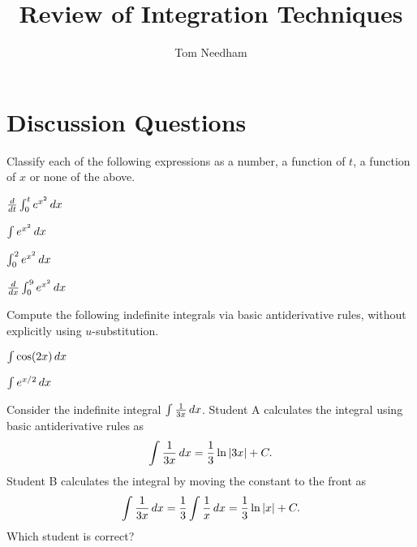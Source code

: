 \documentclass[handout,hints]{ximera}
\author{Tom Needham}
\title[]{Review of Integration Techniques}
\begin{document}
\begin{abstract}
\end{abstract}
\maketitle

\vspace{-0.9in}

\section{Discussion Questions}

\begin{problem}
Classify each of the following expressions as a number, a function of $t$, a function of $x$ or none of the above.

\begin{center}
\begin{inparaenum}
\item $\frac{\mathop{}\!d}{\mathop{}\!d t} \int_0^t e^{x^2} \mathop{}\!d x$ \hspace{0.2in}
\item $\int e^{x^2} \mathop{}\!d x$ \hspace{0.2in}
\item $\int_0^2 e^{x^2} \mathop{}\!d x$ \hspace{0.2in}
\item $\frac{d}{dx} \int_0^9 e^{x^2} \mathop{}\!d x$
\end{inparaenum}
\end{center}
\end{problem}

\begin{problem}
Compute the following indefinite integrals via basic antiderivative rules, without explicitly using $u$-substitution.

\begin{center}
\begin{inparaenum}
\item $\int \cos(2x) \mathop{}\!d x$ \hspace{0.4in}
\item $\int e^{x/2} \mathop{}\!d x$
\end{inparaenum}
\end{center}

\end{problem}

\begin{problem}
Consider the indefinite integral $\int \frac{1}{3x} \mathop{}\!d x$. Student A calculates the integral using basic antiderivative rules as
$$
\int \frac{1}{3x} \mathop{}\!d x = \frac{1}{3} \ln |3x| + C.
$$
Student B calculates the integral by moving the constant to the front as 
$$
\int \frac{1}{3x} \mathop{}\!d x = \frac{1}{3} \int \frac{1}{x} \mathop{}\!d x = \frac{1}{3} \ln |x| + C.
$$
Which student is correct?
\end{problem}
\end{document}
